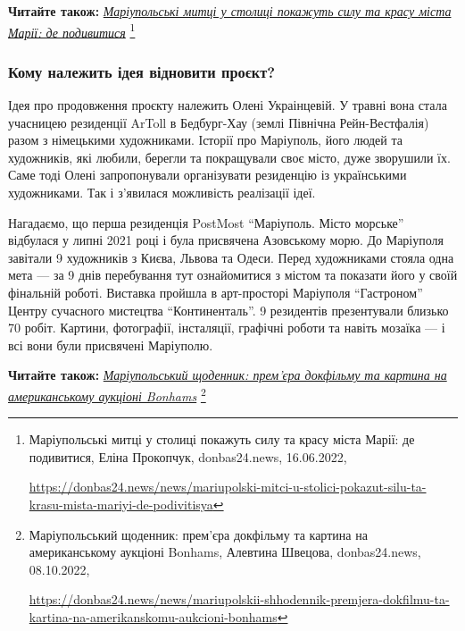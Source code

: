\textbf{Читайте також:} \href{https://donbas24.news/news/mariupolski-mitci-u-stolici-pokazut-silu-ta-krasu-mista-mariyi-de-podivitisya}{\emph{Маріупольські митці у столиці покажуть силу та красу міста Марії: де подивитися}}%
\footnote{Маріупольські митці у столиці покажуть силу та красу міста Марії: де подивитися, Еліна Прокопчук, donbas24.news, 16.06.2022, \par%
\url{https://donbas24.news/news/mariupolski-mitci-u-stolici-pokazut-silu-ta-krasu-mista-mariyi-de-podivitisya}%
}


\subsubsection{Кому належить ідея відновити проєкт?}

Ідея про продовження проєкту належить Олені Украінцевій. У травні вона стала
учасницею резиденції ArToll в Бедбург-Хау (землі Північна Рейн-Вестфалія) разом
з німецькими художниками. Історії про Маріуполь, його людей та художників, які
любили, берегли та покращували своє місто, дуже зворушили їх. Саме тоді Олені
запропонували організувати резиденцію із українськими художниками. Так і
з'явилася можливість реалізації ідеї.

Нагадаємо, що перша резиденція PostMost \enquote{Маріуполь. Місто морське} відбулася у
липні 2021 році і була присвячена Азовському морю. До Маріуполя завітали 9
художників з Києва, Львова та Одеси. Перед художниками стояла одна мета — за 9
днів перебування тут ознайомитися з містом та показати його у своїй фінальній
роботі. Виставка пройшла в арт-просторі Маріуполя \enquote{Гастроном} Центру сучасного
мистецтва \enquote{Континенталь}. 9 резидентів презентували близько 70 робіт. Картини,
фотографії, інсталяції, графічні роботи та навіть мозаїка — і всі вони були
присвячені Маріуполю.

\textbf{Читайте також:} \href{https://donbas24.news/news/mariupolskii-shhodennik-premjera-dokfilmu-ta-kartina-na-amerikanskomu-aukcioni-bonhams}{\emph{Маріупольський щоденник: прем'єра докфільму та картина на американському аукціоні Bonhams}}%
\footnote{Маріупольський щоденник: прем'єра докфільму та картина на американському аукціоні Bonhams, Алевтина Швецова, donbas24.news, 08.10.2022, \par%
\url{https://donbas24.news/news/mariupolskii-shhodennik-premjera-dokfilmu-ta-kartina-na-amerikanskomu-aukcioni-bonhams}%
}

